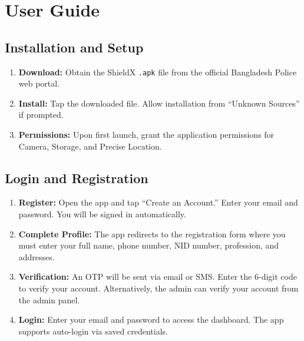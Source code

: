 \documentclass[12pt, a4paper, twoside, openany]{report}
\begin{document}
\chapter{User Guide}
\section*{Installation and Setup}
\begin{enumerate}
    \item[] \textbf{Download:} Obtain the ShieldX \texttt{.apk} file from the official Bangladesh Police web portal.
    \item[] \textbf{Install:} Tap the downloaded file. Allow installation from ``Unknown Sources'' if prompted.
    \item[] \textbf{Permissions:} Upon first launch, grant the application permissions for Camera, Storage, and Precise Location.
\end{enumerate}
\section*{Login and Registration}
\begin{enumerate}
    \item[] \textbf{Register:} Open the app and tap ``Create an Account.'' Enter your email and password. You will be signed in automatically.
    \item[] \textbf{Complete Profile:} The app redirects to the registration form where you must enter your full name, phone number, NID number, profession, and addresses.
    \item[] \textbf{Verification:} An OTP will be sent via email or SMS. Enter the 6-digit code to verify your account. Alternatively, the admin can verify your account from the admin panel.
    \item[] \textbf{Login:} Enter your email and password to access the dashboard. The app supports auto-login via saved credentials.
\end{enumerate}
\end{document}

